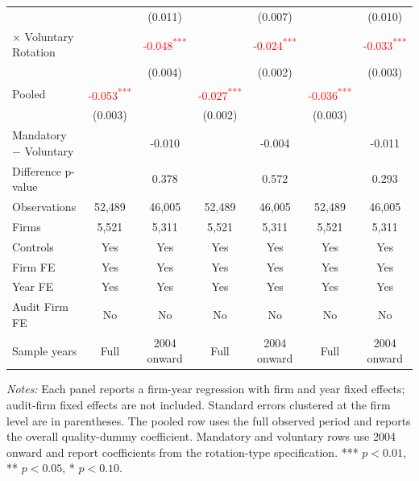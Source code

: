 \documentclass[10pt]{article}
\newcommand{\sym}[1]{\textsuperscript{#1}}
\begin{document}
\begin{minipage}{19cm}
\begin{threeparttable}
\begin{tabular}{l cc cc cc}
 &  & (0.011) &  & (0.007) &  & (0.010) \\
$\times$ Voluntary Rotation &  & \textcolor{red}{-0.048\sym{***}} &  & \textcolor{red}{-0.024\sym{***}} &  & \textcolor{red}{-0.033\sym{***}} \\
 &  & (0.004) &  & (0.002) &  & (0.003) \\
Pooled & \textcolor{red}{-0.053\sym{***}} &  & \textcolor{red}{-0.027\sym{***}} &  & \textcolor{red}{-0.036\sym{***}} &  \\
 & (0.003) &  & (0.002) &  & (0.003) &  \\
Mandatory $-$ Voluntary &  & -0.010 &  & -0.004 &  & -0.011 \\
Difference p-value &  & 0.378 &  & 0.572 &  & 0.293 \\
Observations & 52,489 & 46,005 & 52,489 & 46,005 & 52,489 & 46,005 \\
Firms & 5,521 & 5,311 & 5,521 & 5,311 & 5,521 & 5,311 \\
\midrule
Controls & Yes & Yes & Yes & Yes & Yes & Yes \\
Firm FE & Yes & Yes & Yes & Yes & Yes & Yes \\
Year FE & Yes & Yes & Yes & Yes & Yes & Yes \\
Audit Firm FE & No & No & No & No & No & No \\
Sample years & Full & 2004 onward & Full & 2004 onward & Full & 2004 onward \\
\bottomrule
\end{tabular}
\begin{tablenotes}\fontsize{9}{11}\selectfont
\item \fontsize{9}{11}\selectfont \textit{Notes:} Each panel reports a firm-year regression with firm and year fixed effects; audit-firm fixed effects are not included. Standard errors clustered at the firm level are in parentheses. The pooled row uses the full observed period and reports the overall quality-dummy coefficient. Mandatory and voluntary rows use 2004 onward and report coefficients from the rotation-type specification. *** \(p<0.01\), ** \(p<0.05\), * \(p<0.10\).
\end{tablenotes}
\end{threeparttable}

\end{minipage}
\end{document}
